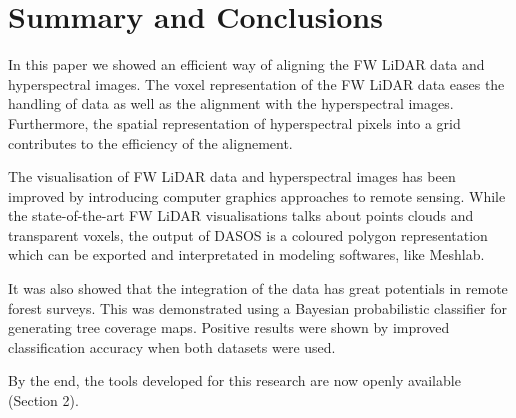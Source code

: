 \documentclass{subfiles}
\begin{document}
\section {Summary and Conclusions}
\par In this paper we showed an efficient way of aligning the FW LiDAR data and hyperspectral images. The voxel representation of the FW LiDAR data eases the handling of data as well as the alignment with the hyperspectral images. Furthermore, the spatial representation of hyperspectral pixels into a grid
contributes to the efficiency of the alignement.

\par The visualisation of FW LiDAR data and hyperspectral images has been improved by introducing computer graphics approaches to remote sensing. While the state-of-the-art FW LiDAR visualisations talks about points clouds and transparent
voxels, the output of DASOS is a coloured polygon representation which can be exported and interpretated in modeling softwares, like Meshlab.

\par It was also showed that the integration of the data has great potentials in remote forest surveys. This was demonstrated using a Bayesian probabilistic classifier for generating tree coverage maps. Positive results were shown by improved classification accuracy when both datasets were used.

\par By the end, the tools developed for this research are now openly available (Section 2). 
\end{document}
